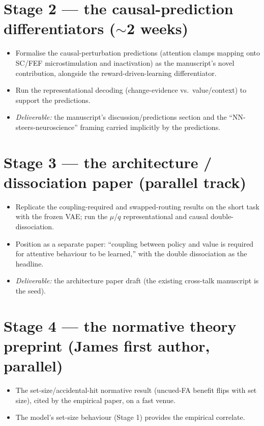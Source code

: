 \section{Stage 2 --- the causal-prediction differentiators ($\sim$2 weeks)}
\begin{itemize}
\item Formalise the causal-perturbation predictions (attention clamps mapping onto SC/FEF
microstimulation and inactivation) as the manuscript's novel contribution, alongside the
reward-driven-learning differentiator.
\item Run the representational decoding (change-evidence vs.\ value/context) to support the
predictions.
\item \emph{Deliverable:} the manuscript's discussion/predictions section and the
``NN-steers-neuroscience'' framing carried implicitly by the predictions.
\end{itemize}

\section{Stage 3 --- the architecture / dissociation paper (parallel track)}
\begin{itemize}
\item Replicate the coupling-required and swapped-routing results on the short task with the
frozen VAE; run the $\mu$/$q$ representational and causal double-dissociation.
\item Position as a separate paper: ``coupling between policy and value is required for
attentive behaviour to be learned,'' with the double dissociation as the headline.
\item \emph{Deliverable:} the architecture paper draft (the existing cross-talk manuscript
is the seed).
\end{itemize}

\section{Stage 4 --- the normative theory preprint (James first author, parallel)}
\begin{itemize}
\item The set-size/accidental-hit normative result (uncued-FA benefit flips with set size),
cited by the empirical paper, on a fast venue.
\item The model's set-size behaviour (Stage 1) provides the empirical correlate.
\end{itemize}

